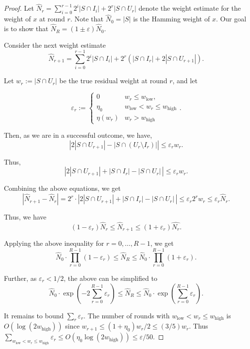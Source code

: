 \documentclass{article}
\renewcommand{\epsilon}{\varepsilon}
\DeclareMathOperator{\high}{\mathrm{high}}
\DeclareMathOperator{\low}{\mathrm{low}}
\newcommand{\<}{\langle}
\renewcommand{\>}{\rangle}
\begin{document}
\begin{proof}
Let $\widehat{N}_r = \sum_{i=0}^{r-1} 2^i |S \cap I_i| + 2^r |S \cap U_r|$ denote the weight estimate for the weight of $x$ at round $r$. Note that $\widehat{N}_0 = |S|$ is the Hamming weight of $x$. Our goal is to show that $\widehat{N}_R = (1\pm \varepsilon) \widehat{N}_0$. 

Consider the next weight estimate  $$\widehat{N}_{r+1} = \sum_{i=0}^{r-1} 2^i  |S \cap I_i| + 2^r (|S \cap I_r| + 2 |S \cap U_{r+1}|).$$

Let $w_r := |S \cap U_r|$ be the true residual weight at round $r$, and let 

$$
\epsilon_r := \begin{cases} 0 & w_r \leq w_{\low},\\
\eta_0 & w_{\low} < w_r \leq w_{\high}\\
\eta(w_r) & w_r > w_{\high}
\end{cases}.
$$

Then, as we are in a successful outcome, we have,
$$\left|2 |S \cap U_{r+1}| - |S \cap (U_r\setminus I_r)| \right| \leq \epsilon_r w_r.$$

Thus, 
$$\left| 2 |S \cap U_{r+1}| + |S \cap I_r|  - |S \cap U_r| \,\right| \leq \epsilon_r w_r.$$

Combining the above equations, we get 
$$|\widehat{N}_{r+1} - \widehat{N}_r| = 2^r \cdot \left| 2 |S \cap U_{r+1}| + |S \cap I_r|  - |S \cap U_r| \,\right| \leq \epsilon_r 2^r w_r \leq \epsilon_r \widehat{N}_r.$$

Thus, we have 
$$(1-\epsilon_r) \widehat{N}_r \leq \widehat{N}_{r+1} \leq (1+\epsilon_r) \widehat{N_r}.$$

Applying the above inequality for $r = 0,\ldots,R-1$, we get 
$$\widehat{N}_0  \cdot \prod_{r=0}^{R-1} (1-\epsilon_r) \leq \widehat{N}_R \leq \widehat{N}_0  \cdot \prod_{r=0}^{R-1} (1+\epsilon_r).$$

Further, as $\epsilon_r < 1/2$, the above can be simplified to 
\begin{equation}\label{eq:sparse1}
    \widehat{N}_0  \cdot \exp\left(-2 \sum_{r=0}^{R-1}\epsilon_r\right) \leq \widehat{N}_R \leq \widehat{N}_0  \cdot \exp\left( \sum_{r=0}^{R-1}\epsilon_r\right) .
\end{equation}

It remains to bound $\sum_r \epsilon_r$. The number of rounds with $w_{\low}<w_r\le w_{\high}$ is $O(\log(2w_{\high}))$ since
$w_{r+1}\le (1+\eta_0)w_r/2\le (3/5)w_r$.
Thus $\sum_{w_{\low}<w_r\le w_{\high}}\epsilon_r\le O(\eta_0\log(2w_{\high}))\le \varepsilon/50$.


\end{proof}
\end{document}
